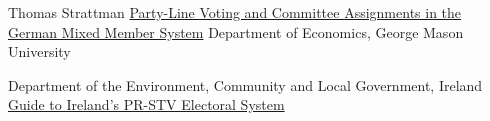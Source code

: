 \begin{thebibliography}{99}
Thomas Strattman
{\color{blue} \href{https://www.researchgate.net/profile/Thomas_Stratmann2/publication/228978716_Party-Line_Voting_and_Committee_Assignments_in_the_German_Mixed_Member_System/links/0c96052d411ad2b0ae000000/Party-Line-Voting-and-Committee-Assignments-in-the-German-Mixed-Member-System.pdf}{Party-Line Voting and Committee Assignments in the German Mixed Member System}}
Department of Economics, George Mason University

Department of the Environment, Community and Local Government, Ireland
{\color{blue} \href{https://www.laois.ie/wp-content/uploads/Guide-to-Irelands-Electoral-System-2.pdf}{Guide to Ireland’s PR-STV Electoral System}}
 
\end{thebibliography}
